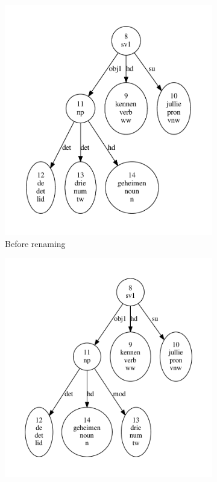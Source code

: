 \begin{figure}[t]
    \begin{subfigure}{0.49\textwidth}
        \centering
        \includegraphics[scale=0.48]{Figures/tw_to_mod1.pdf}
        \caption{Before renaming}
    \end{subfigure}
    \begin{subfigure}{0.49\textwidth}
        \centering
        \includegraphics[scale=0.48]{Figures/tw_to_mod2.pdf}

\end{subfigure}
\end{figure}
